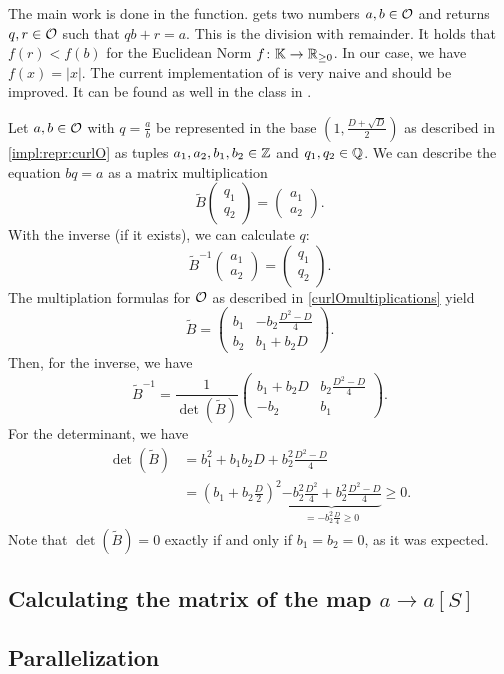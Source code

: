 The main work is done in the  function.  gets two numbers $a, b \in \mathcal{O}$ and returns $q, r \in \mathcal{O}$ such that $q b + r = a$. This is the division with remainder. It holds that $f(r) < f(b)$ for the Euclidean Norm $f \colon \mathbb{K} \rightarrow \mathbb{R}_{\ge 0}$. In our case, we have $f(x) = |x|$. The current implementation of  is very naive and should be improved. It can be found as well in the class  in .

Let $a,b \in \mathcal{O}$ with $q = \tfrac{a}{b}$ be represented in the base $(1, \frac{D + \sqrt{D}} {2})$ as described in \cref{impl:repr:curlO} as tuples $a_1,a_2,b_1,b_2 \in \mathbb{Z}$ and $q_1,q_2 \in \mathbb{Q}$. We can describe the equation $bq = a$ as a matrix multiplication
\[ \tilde{B} \begin{pmatrix} q_1 \\ q_2 \end{pmatrix} = \begin{pmatrix} a_1 \\ a_2 \end{pmatrix} . \]
With the inverse (if it exists), we can calculate $q$:
\[ \tilde{B}^{-1} \begin{pmatrix} a_1 \\ a_2 \end{pmatrix} = \begin{pmatrix} q_1 \\ q_2 \end{pmatrix} . \]
The multiplation formulas for $\mathcal{O}$ as described in \cref{curlOmultiplications} yield
\[ \tilde{B} = \begin{pmatrix}
b_1 & -b_2 \frac{D^2 - D}{4} \\
b_2 & b_1 + b_2 D
\end{pmatrix} . \]
Then, for the inverse, we have
\[ \tilde{B}^{-1} = \frac{1}{\det(\tilde{B})}
\begin{pmatrix}
b_1 + b_2 D & b_2 \frac{D^2 - D}{4} \\
-b_2 & b_1
\end{pmatrix} . \]
For the determinant, we have
\begin{align*}
\det(\tilde{B}) &= b_1^2 + b_1 b_2 D + b_2^2 \frac{D^2-D}{4} \\
&= (b_1 + b_2 \tfrac{D}{2})^2 \underbrace{- b_2^2 \tfrac{D^2}{4} + b_2^2 \tfrac{D^2-D}{4}}_{
= -b_2^2 \tfrac{D}{4} \ge 0} \ge 0.
\end{align*}
Note that $\det(\tilde{B}) = 0$ exactly if and only if $b_1 = b_2 = 0$, as it was expected.

\subsection{}
\label{solveR}
\label{impl:solveR}

\subsection{Calculating the matrix of the map $a \rightarrow a[S]$}
\label{impl:calcMatrix}
\label{calcMatrix}
\label{calcMatrixTrans}


\subsection{Parallelization}
\label{impl:parallelization}
